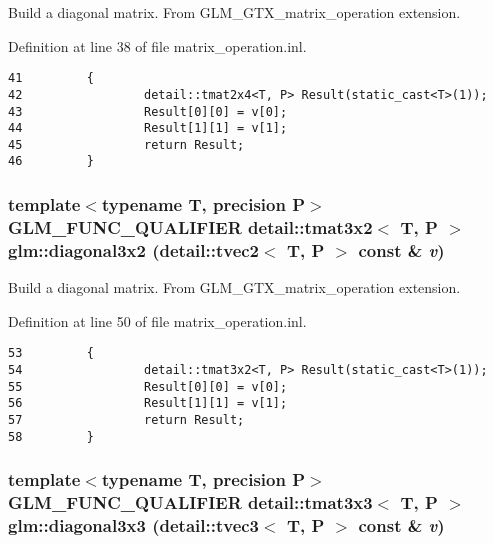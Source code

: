 Build a diagonal matrix. From GLM\_\-GTX\_\-matrix\_\-operation extension. 

Definition at line 38 of file matrix\_\-operation.inl.

\begin{Code}\begin{verbatim}41         {
42                 detail::tmat2x4<T, P> Result(static_cast<T>(1));
43                 Result[0][0] = v[0];
44                 Result[1][1] = v[1];
45                 return Result;
46         }
\end{verbatim}
\end{Code}


\hypertarget{group__gtx__matrix__operation_g91808d304a0220c4e4c68e477ffa2fd2}{
\subsubsection[diagonal3x2]{\setlength{\rightskip}{0pt plus 5cm}template$<$typename T, precision P$>$ GLM\_\-FUNC\_\-QUALIFIER detail::tmat3x2$<$ T, P $>$ glm::diagonal3x2 (detail::tvec2$<$ T, P $>$ const \& {\em v})}}
\label{group__gtx__matrix__operation_g91808d304a0220c4e4c68e477ffa2fd2}


Build a diagonal matrix. From GLM\_\-GTX\_\-matrix\_\-operation extension. 

Definition at line 50 of file matrix\_\-operation.inl.

\begin{Code}\begin{verbatim}53         {
54                 detail::tmat3x2<T, P> Result(static_cast<T>(1));
55                 Result[0][0] = v[0];
56                 Result[1][1] = v[1];
57                 return Result;
58         }
\end{verbatim}
\end{Code}


\hypertarget{group__gtx__matrix__operation_g6cc2ba1eff14f0548370fe4df925975c}{
\subsubsection[diagonal3x3]{\setlength{\rightskip}{0pt plus 5cm}template$<$typename T, precision P$>$ GLM\_\-FUNC\_\-QUALIFIER detail::tmat3x3$<$ T, P $>$ glm::diagonal3x3 (detail::tvec3$<$ T, P $>$ const \& {\em v})}}
\label{group__gtx__matrix__operation_g6cc2ba1eff14f0548370fe4df925975c}


